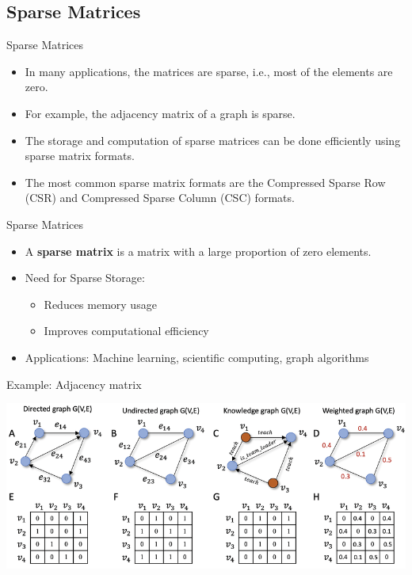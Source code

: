 \documentclass{beamer}
\begin{document}
\subsection{Sparse Matrices}
\begin{frame}{Sparse Matrices}
    \begin{itemize}
        \item In many applications, the matrices are sparse, i.e., most of the elements are zero.
        \item For example, the adjacency matrix of a graph is sparse.
        \item The storage and computation of sparse matrices can be done efficiently using sparse matrix formats.
        \item The most common sparse matrix formats are the Compressed Sparse Row (CSR)
         and Compressed Sparse Column (CSC) formats.
    \end{itemize}
\end{frame}
\begin{frame}{Sparse Matrices}
    \begin{itemize}
        \item A \textbf{sparse matrix} is a matrix with a large proportion of zero elements.
        \item Need for Sparse Storage:
        \begin{itemize}
        \item Reduces memory usage
        \item Improves computational efficiency
        \end{itemize}
        \item Applications: Machine learning, scientific computing, graph algorithms
    \end{itemize}
\end{frame}
\begin{frame}{Example: Adjacency matrix}
\centerline{\includegraphics[width=\textwidth]{Different-types-of-graphs-and-their-corresponding-adjacency-matrix-representations-The.ppm.png}}
\end{frame}
\end{document}
